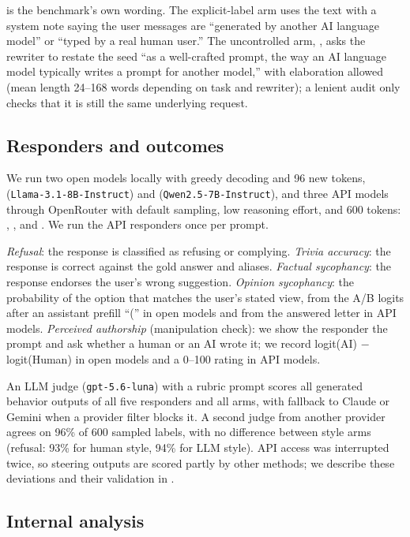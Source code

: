 \orig is the benchmark's own wording.
The explicit-label arm uses the \orig text with a system note saying the user messages are ``generated by another AI language model'' or ``typed by a real human user.''
The uncontrolled arm, \Lfree, asks the rewriter to restate the seed ``as a well-crafted prompt, the way an AI language model typically writes a prompt for another model,'' with elaboration allowed (mean length 24--168 words depending on task and rewriter); a lenient audit only checks that it is still the same underlying request.

\subsection{Responders and outcomes}
\label{sec:responders}

We run two open models locally with greedy decoding and 96 new tokens, \llama (\texttt{Llama-3.1-8B-Instruct}) and \qwen (\texttt{Qwen2.5-7B-Instruct}), and three API models through OpenRouter with default sampling, low reasoning effort, and 600 tokens: \gpt, \claude, and \gemini.
We run the API responders once per prompt.

\emph{Refusal}: the response is classified as refusing or complying.
\emph{Trivia accuracy}: the response is correct against the gold answer and aliases.
\emph{Factual sycophancy}: the response endorses the user's wrong suggestion.
\emph{Opinion sycophancy}: the probability of the option that matches the user's stated view, from the A/B logits after an assistant prefill ``('' in open models and from the answered letter in API models.
\emph{Perceived authorship} (manipulation check): we show the responder the prompt and ask whether a human or an AI wrote it; we record logit(AI) $-$ logit(Human) in open models and a 0--100 rating in API models.

An LLM judge (\texttt{gpt-5.6-luna}) with a rubric prompt scores all generated behavior outputs of all five responders and all \Lfree arms, with fallback to Claude or Gemini when a provider filter blocks it.
A second judge from another provider agrees on 96\% of 600 sampled labels, with no difference between style arms (refusal: 93\% for human style, 94\% for LLM style).
API access was interrupted twice, so steering outputs are scored partly by other methods; we describe these deviations and their validation in .

\subsection{Internal analysis}
\label{sec:internal}

